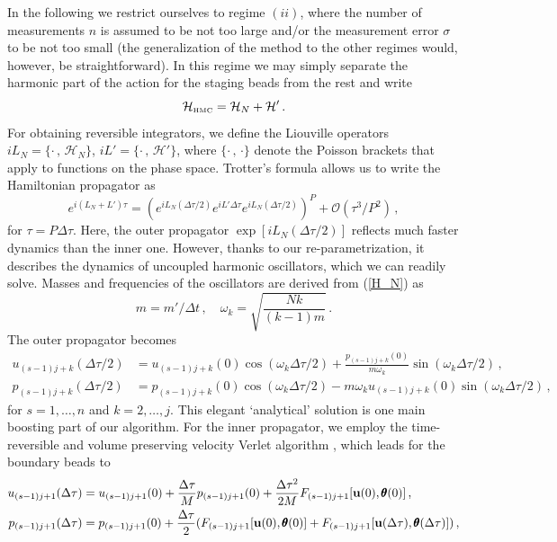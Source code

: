 \documentclass[11pt]{article}
\newcommand{\vc}[1]{{\bf #1 }}
\theoremstyle{definition}
\begin{document}
In the following we restrict ourselves to regime $(ii)$, where the number of measurements $n$ is assumed to be not too large and/or the measurement error $\sigma$ to be not too small (the generalization of the method to the other regimes would, however, be straightforward). In this regime we may simply separate the harmonic part of the action for the staging beads from the rest and write
\begin{equation}
  \mathcal{H}_{\mbox{\tiny HMC}}=\mathcal H_N + \mathcal H'\,.
\end{equation}
For obtaining reversible integrators, we define the Liouville operators
$ iL_N=\{\cdot\,,\,\mathcal H_N\}$, $iL'=\{\cdot\,,\,\mathcal H'\}$,
where $\{\cdot\,,\,\cdot\}$ denote the Poisson brackets that apply to functions on the phase space.
Trotter's formula \cite{trotter_1959} allows us to write the Hamiltonian propagator as
\begin{equation}\label{propagator}
  e^{i(L_N+L')\tau}
  =
  (e^{iL_N(\Delta\tau/2)}e^{iL'\Delta\tau}e^{iL_N(\Delta\tau/2)})^P
  +
  \mathcal O(\tau^3/P^{2})\,,
\end{equation}
for $\tau =P\Delta \tau$.
Here, the outer propagator $\exp[iL_N(\Delta \tau/2)]$ reflects much faster dynamics than the inner one.
However, thanks to our re-parametrization, it describes the dynamics of uncoupled harmonic oscillators, which we can readily solve.
Masses and frequencies of the oscillators are derived from (\ref{H_N}) as
\begin{equation}
  m=m'/\Delta t\,,\quad
  \omega_k=\sqrt{\frac{Nk}{(k-1)m}}\,.
\end{equation}
The outer propagator becomes
\begin{align}
  u_{(s-1)j+k}(\Delta\tau/2)
  &=
  u_{(s-1)j+k}(0)\cos(\omega_k\Delta\tau/2)
  +
  \frac{p_{(s-1)j+k}(0)}{m\omega_k}\sin(\omega_k\Delta\tau/2)\,,
  \\
  p_{(s-1)j+k}(\Delta\tau/2)
  &=
  p_{(s-1)j+k}(0)\cos(\omega_k\Delta\tau/2)
  -
  m\omega_k u_{(s-1)j+k}(0) \sin(\omega_k\Delta\tau/2)\,,
\end{align}
for $s=1,\dots,n$ and $k=2,\dots,j$.
This elegant `analytical' solution is one main boosting part of our algorithm.
For the inner propagator, we employ the time-reversible and volume preserving velocity Verlet algorithm \cite{swope_1982_verlet}, which leads for the boundary beads to
\begin{align}
  u_{(s-1)j+1}(\Delta\tau)
  &= u_{(s-1)j+1}(0)
  +
  \frac{\Delta\tau}{M} p_{(s-1)j+1}(0)
  +
  \frac{\Delta \tau^2}{2M}
  F_{(s-1)j+1}[\vc u(0),{\pmb\theta}(0)]\,,\\
  p_{(s-1)j+1}(\Delta\tau)
  &= p_{(s-1)j+1}(0)
  +
  \frac{\Delta\tau}{2}
  (
  F_{(s-1)j+1}[\vc u(0),{\pmb\theta}(0)]
  +
  F_{(s-1)j+1}[\vc u(\Delta\tau),{\pmb\theta}(\Delta\tau)]
  )\,,
\end{align}
\end{document}
